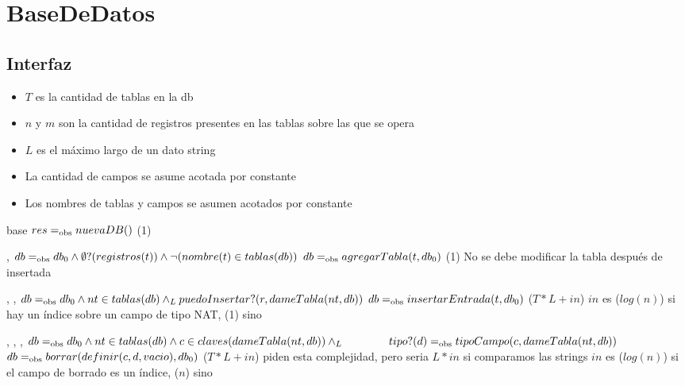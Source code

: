 \section{BaseDeDatos}

\subsection{Interfaz}

\iusa{}

\ioperaciones

\begin{itemize}
    \item{$T$ es la cantidad de tablas en la db}
    \item{$n$ y $m$ son la cantidad de registros presentes en las tablas sobre las que se opera}
    \item{$L$ es el máximo largo de un dato string}
    \item{La cantidad de campos se asume acotada por constante}
    \item{Los nombres de tablas y campos se asumen acotados por constante}
\end{itemize}

{} %
{base} %
{} %
{$res =_{\mathrm{obs}} nuevaDB()$} %
{\bigo(1)} %
{} %
{} %

{   ,
    }
{}
{$db =_{\mathrm{obs}} db_0 \land \emptyset?(registros(t)) \land \neg(nombre(t) \in tablas(db))$}
{$db =_{\mathrm{obs}} agregarTabla(t,db_0)$}
{\bigo(1)}
{No se debe modificar la tabla después de insertada}
{}

{   ,
    ,
    }
{}
{$db =_{\mathrm{obs}} db_0 \land nt \in tablas(db) \land_L puedoInsertar?(r,dameTabla(nt,db))$}
{$db =_{\mathrm{obs}} insertarEntrada(t,db_0)$}
{\bigo($T * L + in$)}
{}
{$in$ es \bigo($log(n)$) si hay un índice sobre un campo de tipo NAT, \bigo(1) sino}

{   ,
    ,
    ,
    }
{}
{$db =_{\mathrm{obs}} db_0 \land nt \in tablas(db) \land c \in claves(dameTabla(nt,db)) \land_L \\
    \hspace*{4em} tipo?(d) =_{\mathrm{obs}} tipoCampo(c,dameTabla(nt,db))$}
{$db =_{\mathrm{obs}} borrar(definir(c,d,vacio),db_0)$}
{\bigo($T * L + in$) \cuidado piden esta complejidad, pero seria $L * in$ si comparamos las strings}
{}
{$in$ es \bigo($log(n)$) si el campo de borrado es un índice, \bigo($n$) sino}

